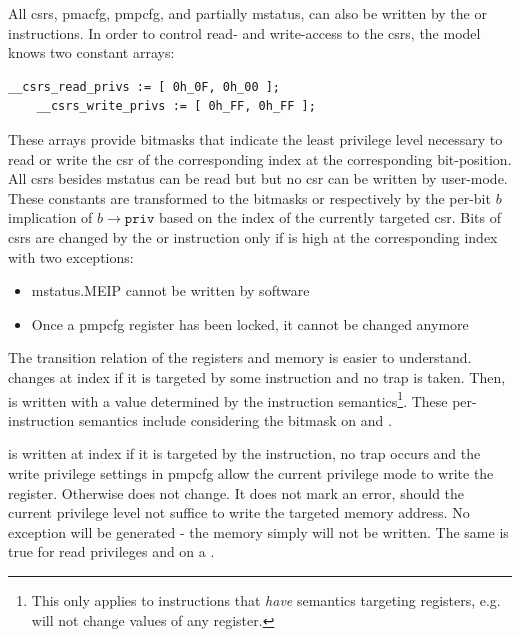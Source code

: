 All \glspl{csr}, \gls{pmacfg}, \gls{pmpcfg}, and partially \gls{mstatus}, can also be written by the  or  instructions.
In order to control read- and write-access to the \glspl{csr}, the model knows two constant arrays:
\begin{lstlisting}[language=smv]
    __csrs_read_privs := [ 0h_0F, 0h_00 ];
    __csrs_write_privs := [ 0h_FF, 0h_FF ];
\end{lstlisting}

These arrays provide bitmasks that indicate the least privilege level necessary to read or write the \gls{csr} of the corresponding index at the corresponding bit-position.
All \glspl{csr} besides \gls{mstatus} can be read but but no \gls{csr} can be written by user-mode.
These constants are transformed to the bitmasks  or  respectively by the per-bit $ b $ implication of $ b \rightarrow \texttt{priv} $ based on the index of the currently targeted \gls{csr}.
Bits of \glspl{csr} are changed by the  or  instruction only if  is high at the corresponding index with two exceptions:
\begin{itemize}
    \item \gls{mstatus}.MEIP cannot be written by software
    \item Once a \gls{pmpcfg} register has been locked, it cannot be changed anymore
\end{itemize}

The transition relation of the registers and memory is easier to understand.
 changes at index  if it is targeted by some instruction and no trap is taken.
Then,  is written with a value determined by the instruction semantics\footnote{%
    This only applies to instructions that \textit{have} semantics targeting registers, e.g.  will not change values of any register.
}.
These per-instruction semantics include considering the  bitmask on  and .

 is written at index  if it is targeted by the  instruction, no trap occurs and the write privilege settings in \gls{pmpcfg} allow the current privilege mode to write the register.
Otherwise  does not change.
It does not mark an error, should the current privilege level not suffice to write the targeted memory address.
No exception will be generated - the memory simply will not be written.
The same is true for read privileges and  on a .

